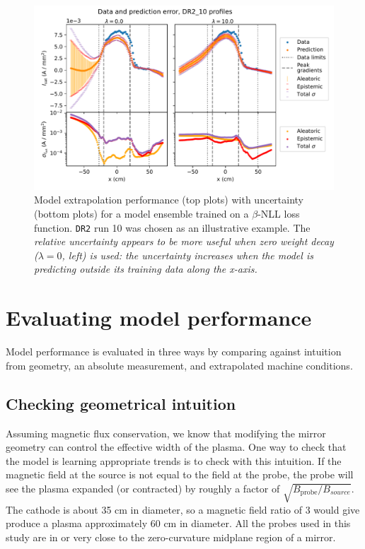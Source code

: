 \begin{figure}
	\centering
	\includegraphics[width=360pt]{figures/extrapolation-profile-variance_DR2_10_wd-comparison_two.pdf}
	\caption[size=12]{\label{fig:extrapolation-profile-var_two}Model extrapolation performance (top plots) with uncertainty (bottom plots) for a model ensemble trained on a $\beta$-NLL loss function. \texttt{DR2} run 10 was chosen as an illustrative example. The \em relative \em uncertainty appears to be more useful when zero weight decay ($\lambda = 0$, left) is used: the uncertainty increases when the model is predicting outside its training data along the x-axis.}
\end{figure}

\section{Evaluating model performance}
\label{sec:validation}

Model performance is evaluated in three ways by comparing against intuition from geometry, an absolute measurement, and extrapolated machine conditions. 


\subsection{Checking geometrical intuition}

Assuming magnetic flux conservation, we know that modifying the mirror geometry can control the effective width of the plasma. One way to check that the model is learning appropriate trends is to check with this intuition. If the magnetic field at the source is not equal to the field at the probe, the probe will see the plasma expanded (or contracted) by roughly a factor of $\sqrt{B_\text{probe}/B_{source}}$. The cathode is about 35 cm in diameter, so a magnetic field ratio of 3 would give produce a plasma approximately 60 cm in diameter. All the probes used in this study are in or very close to the zero-curvature midplane region of a mirror.

